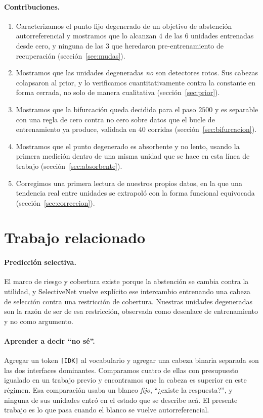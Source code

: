 \documentclass[11pt,a4paper]{article}
\begin{document}
\paragraph{Contribuciones.}
\begin{enumerate}
\item Caracterizamos el punto fijo degenerado de un objetivo de abstención autorreferencial y mostramos
que lo alcanzan $4$ de las $6$ unidades entrenadas desde cero, y ninguna de las $3$ que heredaron
pre-entrenamiento de recuperación (sección~\ref{sec:mudas}).
\item Mostramos que las unidades degeneradas \emph{no} son detectores rotos. Sus cabezas colapsaron al
prior, y lo verificamos cuantitativamente contra la constante en forma cerrada, no solo de manera
cualitativa (sección~\ref{sec:prior}).
\item Mostramos que la bifurcación queda decidida para el paso $2500$ y es separable con una regla de
cero contra no cero sobre datos que el bucle de entrenamiento ya produce, validada en $40$ corridas
(sección~\ref{sec:bifurcacion}).
\item Mostramos que el punto degenerado es absorbente y no lento, usando la primera medición dentro de
una misma unidad que se hace en esta línea de trabajo (sección~\ref{sec:absorbente}).
\item Corregimos una primera lectura de nuestros propios datos, en la que una tendencia real entre
unidades se extrapoló con la forma funcional equivocada (sección~\ref{sec:correccion}).
\end{enumerate}

\section{Trabajo relacionado}
\label{sec:related}

\paragraph{Predicción selectiva.} El marco de riesgo y cobertura
\citep{elyaniv2010selective, geifman2017selective} existe porque la abstención se cambia contra la
utilidad, y SelectiveNet \citep{geifman2019selectivenet} vuelve explícito ese intercambio entrenando
una cabeza de selección contra una restricción de cobertura. Nuestras unidades degeneradas son la razón
de ser de esa restricción, observada como desenlace de entrenamiento y no como argumento.

\paragraph{Aprender a decir ``no sé''.} Agregar un token \texttt{[IDK]} al vocabulario
\citep{cohen2024idk} y agregar una cabeza binaria separada son las dos interfaces dominantes. Comparamos
cuatro de ellas con presupuesto igualado en un trabajo previo \citep{speranza2026abstention} y
encontramos que la cabeza es superior en este régimen. Esa comparación usaba un blanco \emph{fijo},
``¿existe la respuesta?'', y ninguna de sus unidades entró en el estado que se describe acá. El presente
trabajo es lo que pasa cuando el blanco se vuelve autorreferencial.
\end{document}
